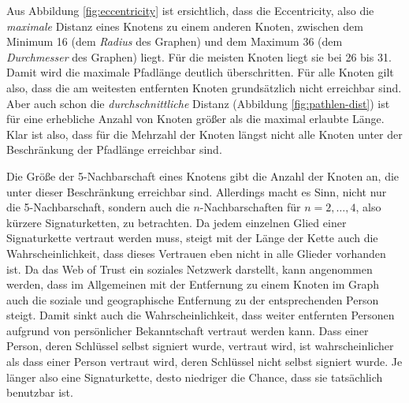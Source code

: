 Aus Abbildung \ref{fig:eccentricity} ist ersichtlich, dass die
Eccentricity, also die \emph{maximale} Distanz eines Knotens zu
einem anderen Knoten, zwischen dem Minimum 16 (dem \emph{Radius}
des Graphen) und dem Maximum 36 (dem \emph{Durchmesser} des Graphen)
liegt. Für die meisten Knoten liegt sie bei 26 bis 31. Damit wird
die maximale Pfadlänge deutlich überschritten. Für alle Knoten
gilt also, dass die am weitesten entfernten Knoten grundsätzlich
nicht erreichbar sind. Aber auch schon die \emph{durchschnittliche}
Distanz (Abbildung \ref{fig:pathlen-dist}) ist für eine erhebliche
Anzahl von Knoten größer als die maximal erlaubte Länge. Klar ist
also, dass für die Mehrzahl der Knoten längst nicht alle Knoten
unter der Beschränkung der Pfadlänge erreichbar sind.

Die Größe der 5-Nachbarschaft eines Knotens gibt die Anzahl der
Knoten an, die unter dieser Beschränkung erreichbar sind. Allerdings
macht es Sinn, nicht nur die 5-Nachbarschaft, sondern auch die
$n$-Nachbarschaften für $n=2,\dots,4$, also kürzere
Signaturketten, zu betrachten. Da jedem einzelnen Glied einer
Signaturkette vertraut werden muss, steigt mit der Länge der Kette
auch die Wahrscheinlichkeit, dass dieses Vertrauen eben nicht in alle
Glieder vorhanden ist. Da das Web of Trust ein soziales Netzwerk
darstellt, kann angenommen werden, dass im Allgemeinen mit der
Entfernung zu einem Knoten im Graph auch die soziale und geographische
Entfernung zu der entsprechenden Person steigt. Damit sinkt auch die
Wahrscheinlichkeit, dass weiter entfernten Personen aufgrund von
persönlicher Bekanntschaft vertraut werden kann. Dass einer Person,
deren Schlüssel selbst signiert wurde, vertraut wird, ist
wahrscheinlicher als dass einer Person vertraut wird, deren
Schlüssel nicht selbst signiert wurde. Je länger also
eine Signaturkette, desto niedriger die Chance, dass sie tatsächlich
benutzbar ist. 

